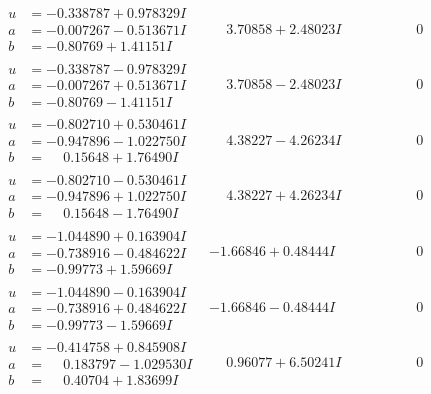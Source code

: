 \documentclass[1p]{elsarticle_modified}
\theoremstyle{definition}
\begin{document}
$$\begin{array}{c|c|c}
\begin{aligned}
u &= -0.338787 + 0.978329 I \\
a &= -0.007267 - 0.513671 I \\
b &= -0.80769 + 1.41151 I\end{aligned}
 & \phantom{-}3.70858 + 2.48023 I & \phantom{-0.000000 } 0 \\ \hline\begin{aligned}
u &= -0.338787 - 0.978329 I \\
a &= -0.007267 + 0.513671 I \\
b &= -0.80769 - 1.41151 I\end{aligned}
 & \phantom{-}3.70858 - 2.48023 I & \phantom{-0.000000 } 0 \\ \hline\begin{aligned}
u &= -0.802710 + 0.530461 I \\
a &= -0.947896 - 1.022750 I \\
b &= \phantom{-}0.15648 + 1.76490 I\end{aligned}
 & \phantom{-}4.38227 - 4.26234 I & \phantom{-0.000000 } 0 \\ \hline\begin{aligned}
u &= -0.802710 - 0.530461 I \\
a &= -0.947896 + 1.022750 I \\
b &= \phantom{-}0.15648 - 1.76490 I\end{aligned}
 & \phantom{-}4.38227 + 4.26234 I & \phantom{-0.000000 } 0 \\ \hline\begin{aligned}
u &= -1.044890 + 0.163904 I \\
a &= -0.738916 - 0.484622 I \\
b &= -0.99773 + 1.59669 I\end{aligned}
 & -1.66846 + 0.48444 I & \phantom{-0.000000 } 0 \\ \hline\begin{aligned}
u &= -1.044890 - 0.163904 I \\
a &= -0.738916 + 0.484622 I \\
b &= -0.99773 - 1.59669 I\end{aligned}
 & -1.66846 - 0.48444 I & \phantom{-0.000000 } 0 \\ \hline\begin{aligned}
u &= -0.414758 + 0.845908 I \\
a &= \phantom{-}0.183797 - 1.029530 I \\
b &= \phantom{-}0.40704 + 1.83699 I\end{aligned}
 & \phantom{-}0.96077 + 6.50241 I & \phantom{-0.000000 } 0 \\ \hline\begin{aligned}

\end{aligned}
\end{array}$$
\end{document}
